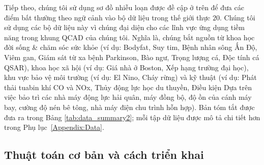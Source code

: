 \begin{table}[!htbp]
\end{table}Tiếp theo, chúng tôi sử dụng sơ đồ nhiễu loạn được đề cập ở trên để đưa các điểm bất thường theo ngữ cảnh vào bộ dữ liệu trong thế giới thực $20$. Chúng tôi sử dụng các bộ dữ liệu này vì chúng đại diện cho các lĩnh vực ứng dụng tiềm năng trong khung QCAD của chúng tôi. Nghĩa là, chúng bắt nguồn từ khoa học đời sống \& chăm sóc sức khỏe (ví dụ: Bodyfat, Suy tim, Bệnh nhân sông Ấn Độ, Viêm gan, Giám sát từ xa bệnh Parkinson, Bào ngư, Trọng lượng cá, Độc tính cá QSAR), khoa học xã hội (ví dụ: Giá nhà ở Boston, Xếp hạng trường đại học), khu vực bảo vệ môi trường (ví dụ: El Nino, Cháy rừng) và kỹ thuật (ví dụ: Phát thải tuabin khí CO và NOx, Thủy động lực học du thuyền, Điều kiện Dựa trên việc bảo trì các nhà máy động lực hải quân, máy đồng bộ, độ ồn của cánh máy bay, cường độ nén bê tông, nhà máy điện chu trình hỗn hợp). Bản tóm tắt được đưa ra trong Bảng \ref{tab:data_summary2}; mỗi tập dữ liệu được mô tả chi tiết hơn trong Phụ lục~\ref{Appendix:Data}.

\subsection{Thuật toán cơ bản và cách triển khai}
\label{subsec:baselines}

